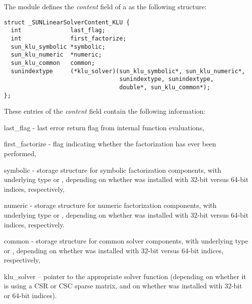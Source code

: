 The {\sunlinsolklu} module defines the \textit{content} field of a
 as the following structure:
\begin{verbatim}
struct _SUNLinearSolverContent_KLU {
  int              last_flag;
  int              first_factorize;
  sun_klu_symbolic *symbolic;
  sun_klu_numeric  *numeric;
  sun_klu_common   common;
  sunindextype     (*klu_solver)(sun_klu_symbolic*, sun_klu_numeric*,
                                 sunindextype, sunindextype,
                                 double*, sun_klu_common*);
};
\end{verbatim}
These entries of the \emph{content} field contain the following
information:
\begin{args}
  \item[last\_flag] - last error return flag from internal function evaluations,
  \item[first\_factorize] - flag indicating whether the factorization
    has ever been performed,
  \item[symbolic] - {\klu} storage structure for symbolic
    factorization components, with underlying type 
    or , depending on whether {\sundials} was
    installed with 32-bit versus 64-bit indices, respectively,
  \item[numeric] - {\klu} storage structure for numeric factorization
    components, with underlying type  or
    , depending on whether {\sundials} was
    installed with 32-bit versus 64-bit indices, respectively.
  \item[common] - storage structure for common {\klu} solver
    components, with underlying type  or
    , depending on whether {\sundials} was
    installed with 32-bit versus 64-bit indices, respectively,
  \item[klu\_solver] -- pointer to the appropriate {\klu} solver function
    (depending on whether it is using a CSR or CSC sparse matrix, and
    on whether {\sundials} was installed with 32-bit or 64-bit indices).
\end{args}
